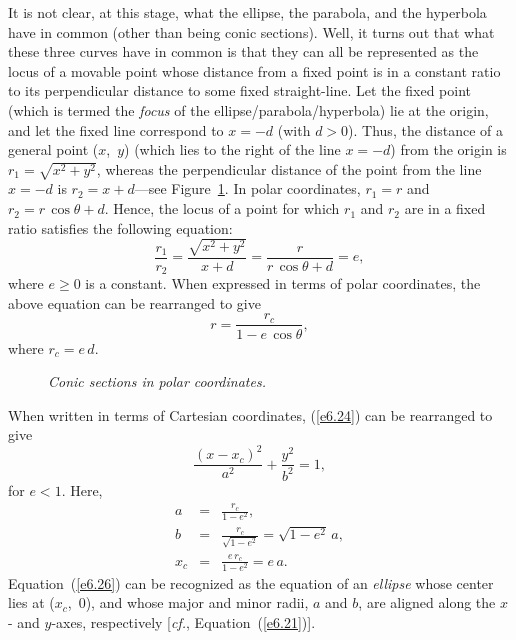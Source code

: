 It is not clear, at this stage, what  the ellipse, the parabola, and the hyperbola
have  in common (other than being conic sections). Well, it turns out that what these three curves
have in common is that they can all be represented as the locus of a movable point whose distance from
a fixed point is in a constant ratio to its perpendicular distance to some
fixed straight-line. Let the fixed point (which is termed the {\em focus}
of the ellipse/parabola/hyperbola) lie at the origin, and let
the fixed line correspond to  $x=-d$ (with $d>0$). Thus, the distance of a general point ($x$,\, $y$) (which lies to the right of the line $x=-d$) from the origin is $r_1=\sqrt{x^2+y^2}$, whereas the perpendicular distance of the point from
the line $x=-d$ is $r_2 = x+d$---see Figure~\ref{conic}. 
In polar coordinates, $r_1=r$ and $r_2 =  r\,\cos\theta+d$.
Hence, the locus of a point for which
$r_1$ and $r_2$ are in a fixed ratio satisfies the following equation:
\begin{equation}\label{e6.24}
\frac{r_1}{r_2} = \frac{\sqrt{x^2+y^2}}{x+d}= \frac{r}{r\,\cos\theta+d}=e,
\end{equation}
where $e\geq 0$ is a constant. When expressed in terms of 
polar coordinates, the above equation can be rearranged to give
\begin{equation}\label{e6.25}
r = \frac{r_c}{1-e\,\cos\theta},
\end{equation}
where $r_c=e\,d$. 

\begin{figure}
\epsfysize=2.25in
\centerline{}
\caption{\em Conic sections in polar coordinates.}\label{conic}
\end{figure}

When written in terms of Cartesian coordinates, (\ref{e6.24})
can be rearranged to give
\begin{equation}\label{e6.26}
\frac{(x-x_c)^2}{a^2} + \frac{y^2}{b^2} = 1,
\end{equation}
for $e<1$. Here, 
\begin{eqnarray}
a &=& \frac{r_c}{1-e^2},\label{e6.27}\\[0.5ex]
b &=& \frac{r_c}{\sqrt{1-e^2}}=\sqrt{1-e^2}\,a,\label{e6.28}\\[0.5ex]
x_c &=& \frac{e\,r_c}{1-e^2}= e\,a.
\end{eqnarray}
Equation~(\ref{e6.26}) can be recognized as the equation of an {\em ellipse}
whose center lies at ($x_c$,\, $0$), and whose major and minor radii,
$a$ and $b$, are aligned along the $x$- and $y$-axes, respectively
[{\em cf.}, Equation~(\ref{e6.21})].

